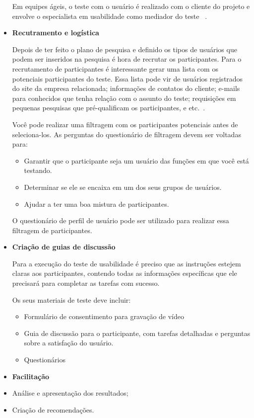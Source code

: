 \begin{itemize}
	Em equipes ágeis, o teste com o usuário é realizado com o cliente do projeto e envolve o especialista em usabilidade como mediador do teste ~\cite{santos2012}.

\item \textbf{Recutramento e logística}

Depois de ter feito o plano de pesquisa e definido os tipos de usuários que podem ser inseridos na pesquisa é hora de recrutar os participantes.
Para o recrutamento de participantes é interessante gerar uma lista com os potenciais participantes do teste. Essa lista pode vir de usuários registrados do site da empresa relacionada; informações de contatos do cliente; e-mails para conhecidos que tenha relação com o assunto do teste; requisições em pequenas pesquisas que pré-qualificam os participantes, e etc.~\cite{unger2009}.

Você pode realizar uma filtragem com os participantes potenciais antes de seleciona-los. As perguntas do questionário de filtragem devem ser voltadas para:

	\begin{itemize}
	\item Garantir que o participante seja um usuário das funções em que você está testando.
	\item Determinar se ele se encaixa em um dos seus grupos de usuários.
	\item Ajudar a ter uma boa mistura de participantes.
	\end{itemize}

O questionário de perfil de usuário pode ser utilizado para realizar essa filtragem de participantes.


\item \textbf{Criação de guias de discussão}

Para a execução do teste de usabilidade é preciso que as instruções estejem claras aos participantes, contendo todas as informações específicas que ele precisará para completar as tarefas com sucesso.

Os seus materiais de teste deve incluir:

	\begin{itemize}
		\item Formulário de consentimento para gravação de vídeo
		\item Guia de discussão para o participante, com tarefas detalhadas e perguntas sobre a satisfação do usuário.
		\item Questionários
	\end{itemize}

\item \textbf{Facilitação}

\item Análise e apresentação dos resultados;
\item Criação de recomendações.

\end{itemize}


